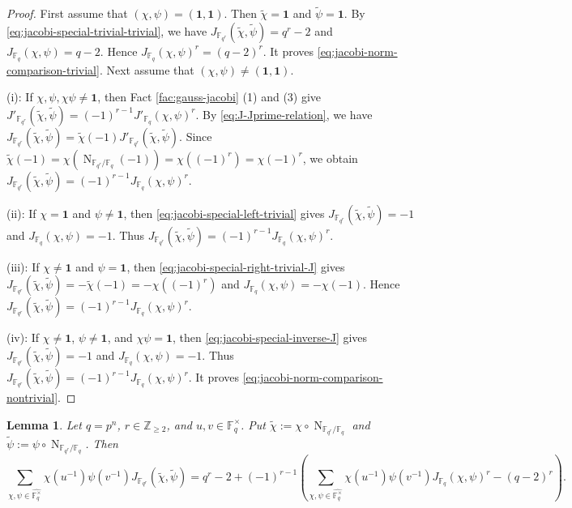 \documentclass[10pt,a4paper]{article}
\newtheorem{lem}[thm]{Lemma}
\newcommand{\Norm}{\operatorname{N}}
\newcommand{\one}{\mathbf{1}}
\numberwithin{equation}{section}
\begin{document}
\begin{proof}
First assume that $(\chi,\psi)=(\one,\one)$. Then $\widetilde{\chi}=\one$ and $\widetilde{\psi}=\one$. By \eqref{eq:jacobi-special-trivial-trivial}, we have
$J_{\mathbb{F}_{q^r}}(\widetilde{\chi},\widetilde{\psi})=q^r-2$
and
$J_{\mathbb{F}_q}(\chi,\psi)=q-2$.
Hence
$J_{\mathbb{F}_q}(\chi,\psi)^r=(q-2)^r$.
It proves \eqref{eq:jacobi-norm-comparison-trivial}. Next assume that $(\chi,\psi)\neq(\one,\one)$.

\noindent\textup{(i)}: If $\chi, \psi, \chi\psi\neq\one$, then Fact \ref{fac:gauss-jacobi} \textup{(1)} and \textup{(3)} give
$J'_{\mathbb{F}_{q^r}}(\widetilde{\chi},\widetilde{\psi})=(-1)^{r-1}J'_{\mathbb{F}_q}(\chi,\psi)^r$.
By \eqref{eq:J-Jprime-relation}, we have
$J_{\mathbb{F}_{q^r}}(\widetilde{\chi},\widetilde{\psi})=\widetilde{\chi}(-1)J'_{\mathbb{F}_{q^r}}(\widetilde{\chi},\widetilde{\psi})$.
Since $\widetilde{\chi}(-1)=\chi(\Norm_{\mathbb{F}_{q^r}/\mathbb{F}_q}(-1))=\chi((-1)^r)=\chi(-1)^r$, we obtain
$J_{\mathbb{F}_{q^r}}(\widetilde{\chi},\widetilde{\psi})=(-1)^{r-1}J_{\mathbb{F}_q}(\chi,\psi)^r$.

\noindent\textup{(ii)}: If $\chi=\one$ and $\psi\neq\one$, then \eqref{eq:jacobi-special-left-trivial} gives
$J_{\mathbb{F}_{q^r}}(\widetilde{\chi},\widetilde{\psi})=-1$
and
$J_{\mathbb{F}_q}(\chi,\psi)=-1$.
Thus
$J_{\mathbb{F}_{q^r}}(\widetilde{\chi},\widetilde{\psi})=(-1)^{r-1}J_{\mathbb{F}_q}(\chi,\psi)^r$.

\noindent\textup{(iii)}: If $\chi\neq\one$ and $\psi=\one$, then \eqref{eq:jacobi-special-right-trivial-J} gives
$J_{\mathbb{F}_{q^r}}(\widetilde{\chi},\widetilde{\psi})=-\widetilde{\chi}(-1)=-\chi((-1)^r)$
and
$J_{\mathbb{F}_q}(\chi,\psi)=-\chi(-1)$.
Hence
$J_{\mathbb{F}_{q^r}}(\widetilde{\chi},\widetilde{\psi})=(-1)^{r-1}J_{\mathbb{F}_q}(\chi,\psi)^r$.

\noindent\textup{(iv)}: If $\chi\neq\one$, $\psi\neq\one$, and $\chi\psi=\one$, then \eqref{eq:jacobi-special-inverse-J} gives
$J_{\mathbb{F}_{q^r}}(\widetilde{\chi},\widetilde{\psi})=-1$
and
$J_{\mathbb{F}_q}(\chi,\psi)=-1$.
Thus
$J_{\mathbb{F}_{q^r}}(\widetilde{\chi},\widetilde{\psi})=(-1)^{r-1}J_{\mathbb{F}_q}(\chi,\psi)^r$.
It proves \eqref{eq:jacobi-norm-comparison-nontrivial}.
\end{proof}

\begin{lem}\label{lem:weighted-jacobi-norm-comparison}
Let $q=p^n$, $r\in \mathbb{Z}_{\ge 2}$, and $u, v\in\mathbb{F}_q^\times$. Put $\widetilde{\chi}:=\chi\circ\Norm_{\mathbb{F}_{q^r}/\mathbb{F}_q}$ and $\widetilde{\psi}:=\psi\circ\Norm_{\mathbb{F}_{q^r}/\mathbb{F}_q}$. Then
\begin{equation}\label{eq:weighted-jacobi-norm-comparison}
\sum_{\chi,\psi\in\widehat{\mathbb{F}_q^\times}}\chi(u^{-1})\psi(v^{-1})J_{\mathbb{F}_{q^r}}(\widetilde{\chi},\widetilde{\psi})=q^r-2+(-1)^{r-1}\left(\sum_{\chi,\psi\in\widehat{\mathbb{F}_q^\times}}\chi(u^{-1})\psi(v^{-1})J_{\mathbb{F}_q}(\chi,\psi)^r-(q-2)^r\right).
\end{equation}
\end{lem}
\end{document}
